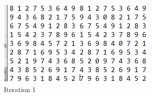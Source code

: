 \documentclass{article}
\begin{document}
\begin{figure}[!htb]
  \includegraphics[width=\linewidth]{iteration1.png}
  \caption{Iteration 1}\label{fig:awesome_image1}
\endminipage\hfill
{}
  \includegraphics[width=\linewidth]{iteration2.png}

\end{figure}
\end{document}
